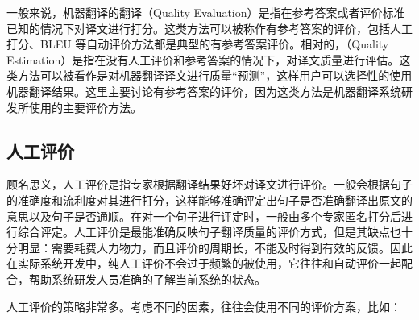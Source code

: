 \parinterval 一般来说，机器翻译的翻译{\small{}}（Quality Evaluation）是指在参考答案或者评价标准已知的情况下对译文进行打分。这类方法可以被称作有参考答案的评价，包括人工打分、BLEU 等自动评价方法都是典型的有参考答案评价。相对的，{\small{}}（Quality Estimation）是指在没有人工评价和参考答案的情况下，对译文质量进行评估。这类方法可以被看作是对机器翻译译文进行质量``预测''，这样用户可以选择性的使用机器翻译结果。这里主要讨论有参考答案的评价，因为这类方法是机器翻译系统研发所使用的主要评价方法。


\subsection{人工评价}

\parinterval 顾名思义，人工评价是指专家根据翻译结果好坏对译文进行评价。一般会根据句子的准确度和流利度对其进行打分，这样能够准确评定出句子是否准确翻译出原文的意思以及句子是否通顺。在对一个句子进行评定时，一般由多个专家匿名打分后进行综合评定。人工评价是最能准确反映句子翻译质量的评价方式，但是其缺点也十分明显：需要耗费人力物力，而且评价的周期长，不能及时得到有效的反馈。因此在实际系统开发中，纯人工评价不会过于频繁的被使用，它往往和自动评价一起配合，帮助系统研发人员准确的了解当前系统的状态。

\parinterval 人工评价的策略非常多。考虑不同的因素，往往会使用不同的评价方案，比如：

